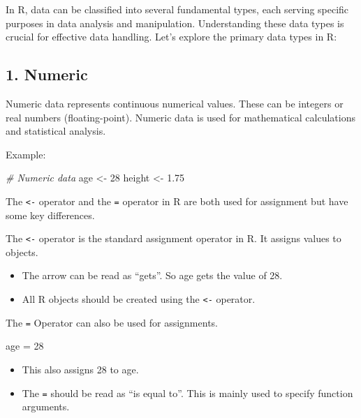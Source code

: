 \documentclass[
]{book}
\newenvironment{Shaded}{\begin{snugshade}}{\end{snugshade}}
\newcommand{\CommentTok}[1]{\textcolor[rgb]{0.56,0.35,0.01}{\textit{#1}}}
\newcommand{\DecValTok}[1]{\textcolor[rgb]{0.00,0.00,0.81}{#1}}
\newcommand{\FloatTok}[1]{\textcolor[rgb]{0.00,0.00,0.81}{#1}}
\newcommand{\NormalTok}[1]{#1}
\newcommand{\OtherTok}[1]{\textcolor[rgb]{0.56,0.35,0.01}{#1}}
\begin{document}
In R, data can be classified into several fundamental types, each serving specific purposes in data analysis and manipulation. Understanding these data types is crucial for effective data handling. Let's explore the primary data types in R:

\hypertarget{numeric}{%
\subsection{1. Numeric}\label{numeric}}

Numeric data represents continuous numerical values. These can be integers or real numbers (floating-point). Numeric data is used for mathematical calculations and statistical analysis.

Example:

\begin{Shaded}
\begin{Highlighting}[]
\CommentTok{\# Numeric data}
\NormalTok{age }\OtherTok{\textless{}{-}} \DecValTok{28}
\NormalTok{height }\OtherTok{\textless{}{-}} \FloatTok{1.75}
\end{Highlighting}
\end{Shaded}

The \texttt{\textless{}-} operator and the \texttt{=} operator in R are both used for assignment but have some key differences.

The \texttt{\textless{}-} operator is the standard assignment operator in R. It assigns values to objects.

\begin{itemize}
\item
  The arrow can be read as ``gets''. So age gets the value of 28.
\item
  All R objects should be created using the \texttt{\textless{}-} operator.
\end{itemize}

The \texttt{=} Operator can also be used for assignments.

\begin{Shaded}
\begin{Highlighting}[]
\NormalTok{age }\OtherTok{=} \DecValTok{28}
\end{Highlighting}
\end{Shaded}

\begin{itemize}
\item
  This also assigns 28 to age.
\item
  The \texttt{=} should be read as ``is equal to''. This is mainly used to specify function arguments.
\end{itemize}
\end{document}
